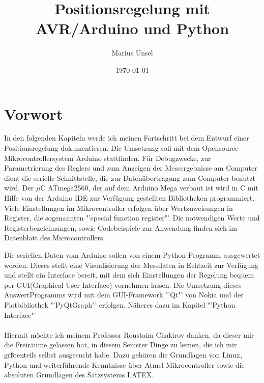 \documentclass[a4paper]{report}
\author{Marius Unsel}
\title{Positionsregelung mit AVR/Arduino und Python}
\date{\today}
\begin{document}
\maketitle
\tableofcontents
\chapter{Vorwort}
In den folgenden Kapiteln werde ich meinen Fortschritt bei
dem Entwurf einer Positionsregelung dokumentieren.
Die Umsetzung soll mit dem Opensource Mikrocontrollersystem
Arduino stattfinden. Für Debugzwecke, zur Parametrierung des
Reglers und zum Anzeigen der Messergebnisse am Computer dient die serielle Schnittstelle, die zur Daten\"ubertragung zum Computer benutzt wird. Der $\mu$C ATmega2560, der auf dem Arduino Mega verbaut ist wird in C mit Hilfe von der Arduino IDE zur Verf\"ugung gestellten Bibliotheken programmiert. Viele Einstellungen im Mikrocontroller erfolgen über Wertzuweisungen in Register, die sogenannten "'special function register"'. Die notwendigen Werte und Registerbezeichnungen, sowie Codebeispiele zur Anwendung finden sich im Datenblatt des Microcontrollers.

Die seriellen Daten vom Arduino sollen von einem Python-Programm ausgewertet werden. Dieses stellt eine Visualisierung der Messdaten in Echtzeit zur Verf\"ugung und stellt ein Interface bereit, mit dem sich Einstellungen der Regelung bequem per GUI(Graphical User Interface) vornehmen lassen. Die Umsetzung dieses AuswertProgramms wird mit dem GUI-Framework "'Qt"' von Nokia und der Plotbibliothek "'PyQtGraph"' erfolgen. N\"aheres dazu im Kapitel "'Python Interface"'
\\
\\
Hiermit m\"ochte ich meinem Professor Roustaim Chakirov danken, da dieser mir die Freir\"aume gelassen hat, in diesem Semster Dinge zu lernen, die ich mir gr\"{\ss}tenteils selbst ausgesucht habe. Dazu geh\"oren die Grundlagen von Linux, Python und weiterf\"uhrende Kenntnisse \"uber Atmel Mikrocontroller sowie die absoluten Grundlagen des Satzsystems LATEX.
\end{document}
